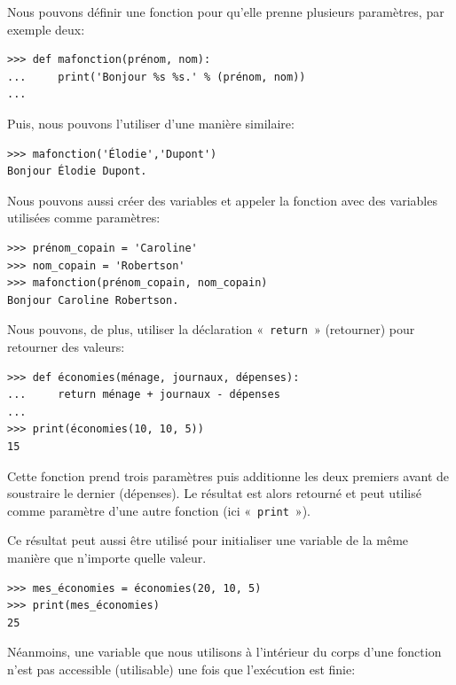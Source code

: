 Nous pouvons définir une fonction pour qu'elle prenne plusieurs paramètres, par exemple deux:

\begin{Verbatim}[frame=single,rulecolor=\color{mbleu}, label=à taper]
>>> def mafonction(prénom, nom):
...     print('Bonjour %s %s.' % (prénom, nom))
...
\end{Verbatim}

Puis, nous pouvons l'utiliser d'une manière similaire:

\begin{Verbatim}[frame=single,rulecolor=\color{mbleu}, label=à taper]
>>> mafonction('Élodie','Dupont')
Bonjour Élodie Dupont.
\end{Verbatim}

Nous pouvons aussi créer des variables et appeler la fonction avec des variables utilisées comme paramètres:

\begin{Verbatim}[frame=single,rulecolor=\color{mbleu}, label=à taper]
>>> prénom_copain = 'Caroline'
>>> nom_copain = 'Robertson'
>>> mafonction(prénom_copain, nom_copain)
Bonjour Caroline Robertson.
\end{Verbatim}

Nous pouvons, de plus, utiliser la déclaration « \texttt{return} » (retourner) pour retourner des valeurs:

\begin{Verbatim}[frame=single,rulecolor=\color{mbleu}, label=à taper]
>>> def économies(ménage, journaux, dépenses):
...     return ménage + journaux - dépenses
...
>>> print(économies(10, 10, 5))
15
\end{Verbatim}

Cette fonction prend trois paramètres puis additionne les deux premiers avant de soustraire le dernier (dépenses). Le résultat est alors retourné et peut utilisé comme paramètre d'une autre fonction (ici « \texttt{print} »).

Ce résultat peut aussi être utilisé pour initialiser une variable de la même manière que n'importe quelle valeur.

\begin{Verbatim}[frame=single,rulecolor=\color{mbleu}, label=à taper]
>>> mes_économies = économies(20, 10, 5)
>>> print(mes_économies)
25
\end{Verbatim}

Néanmoins, une variable que nous utilisons à l'intérieur du corps d'une fonction n'est pas accessible (utilisable) une fois que l'exécution est finie:

